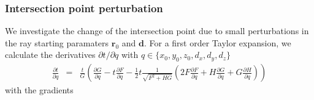 \documentclass[12pt,a4paper,twoside,openright,BCOR10mm,headsepline,titlepage,abstracton,chapterprefix,final]{scrreprt}
\newcommand\Vector[1]{{\mathbf{#1}}}
\newcommand\Location{\Vector{r}}
\begin{document}
\subsubsection{Intersection point perturbation}
We investigate the change of the intersection point due to small perturbations in the ray starting paramaters $\Location_0$ and $\Vector{d}$.
For a first order Taylor expansion, we calculate the derivatives $\partial t / \partial q$
with $q \in \{ x_0, y_0, z_0, d_x, d_y, d_z \}$
\begin{eqnarray}
 \frac{\partial t}{\partial q} 
 &=& 
  \frac{t}{G}
   \left(
     \frac{\partial G}{\partial q} 
     - t \frac{\partial F}{\partial q}
     - \frac{1}{2} t \frac{1}{\sqrt{F^2 + H G}}
     \left(
         2 F \frac{\partial F}{\partial q}
       + H \frac{\partial G}{\partial q}
       + G \frac{\partial H}{\partial q}
     \right)
  \right) 
  \label{eq:derivative_of_t}
\end{eqnarray}
with the gradients
\end{document}
